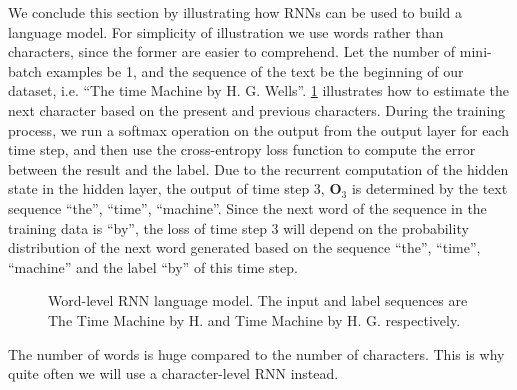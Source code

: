 We conclude this section by illustrating how RNNs can be used to build a language model. For simplicity of illustration we use words rather than characters, since the former are easier to comprehend. Let the number of mini-batch examples be 1, and the sequence of the text be the beginning of our dataset, i.e. “The time Machine by H. G. Wells”. \cref{fig:rnn-train} illustrates how to estimate the next character based on the present and previous characters. During the training process, we run a softmax operation on the output from the output layer for each time step, and then use the cross-entropy loss function to compute the error between the result and the label. Due to the recurrent computation of the hidden state in the hidden layer, the output of time step 3, $\mathbf{O}_3$ is determined by the text sequence “the”, “time”, “machine”. Since the next word of the sequence in the training data is “by”, the loss of time step 3 will depend on the probability distribution of the next word generated based on the sequence “the”, “time”, “machine” and the label “by” of this time step.

\begin{figure}[hpt]
	\centering
	
	\caption{Word-level RNN language model. The input and label sequences are The Time Machine by H. and Time Machine by H. G. respectively.}
	\label{fig:rnn-train}
\end{figure}


The number of words is huge compared to the number of characters. This is why quite often we will use a character-level RNN instead.



% 	

